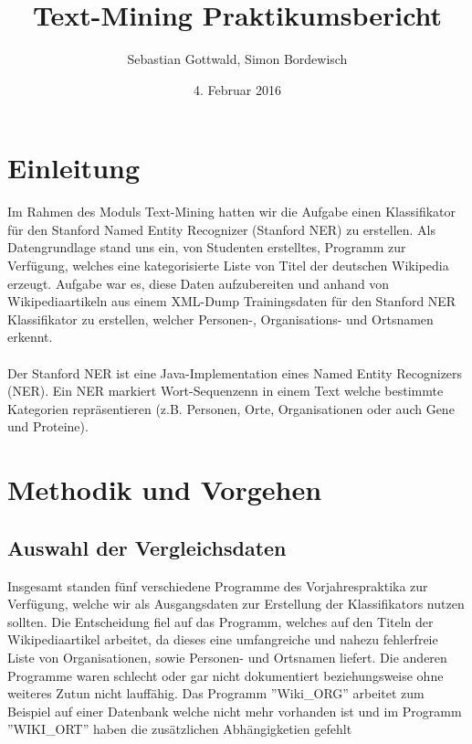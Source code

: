 \documentclass[a4paper]{article}
\author{Sebastian Gottwald, Simon Bordewisch}
\title{Text-Mining Praktikumsbericht}
\date{4. Februar 2016}
\begin{document}
\begin{titlepage}
\maketitle
\end{titlepage}

\section{Einleitung}
	Im Rahmen des Moduls Text-Mining hatten wir die Aufgabe einen Klassifikator für den Stanford Named Entity Recognizer (Stanford NER) zu erstellen. 
	Als Datengrundlage stand uns ein, von Studenten erstelltes, Programm zur Verfügung, welches eine kategorisierte Liste von Titel der deutschen Wikipedia erzeugt.
	Aufgabe war es, diese Daten aufzubereiten und anhand von Wikipediaartikeln aus einem XML-Dump Trainingsdaten für den Stanford NER Klassifikator zu erstellen, welcher Personen-, Organisations- und Ortsnamen erkennt.
	\\\\
	Der Stanford NER ist eine Java-Implementation eines Named Entity Recognizers (NER). Ein NER markiert Wort-Sequenzenn in einem Text welche bestimmte Kategorien repräsentieren (z.B. Personen, Orte, Organisationen oder auch Gene und Proteine).
\section{Methodik und Vorgehen}
	\subsection{Auswahl der Vergleichsdaten}
		Insgesamt standen fünf verschiedene Programme des Vorjahrespraktika zur Verfügung, welche wir als Ausgangsdaten zur Erstellung der Klassifikators nutzen sollten.
		Die Entscheidung fiel auf das Programm, welches auf den Titeln der Wikipediaartikel arbeitet, da dieses eine umfangreiche und nahezu fehlerfreie Liste von Organisationen, sowie Personen- und Ortsnamen liefert.  
		Die anderen Programme waren schlecht oder gar nicht dokumentiert beziehungsweise ohne weiteres Zutun nicht lauffähig. 
		Das Programm ''Wiki\_ORG'' arbeitet zum Beispiel auf einer Datenbank welche nicht mehr vorhanden ist und im Programm ''WIKI\_ORT'' haben die zusätzlichen Abhängigketien gefehlt
		
\end{document}

